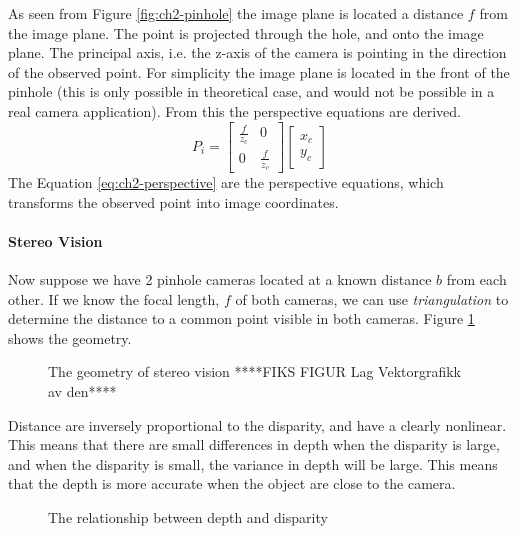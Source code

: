 	As seen from Figure \ref{fig:ch2-pinhole} the image plane is located a distance $f$ from the image plane. 
	The point is projected through the hole, and onto the image plane. The principal axis, i.e. the z-axis of the
	camera is pointing
	in the direction of the observed point. For simplicity the image plane is located in the front of the
	pinhole (this is only possible in theoretical case, and would not be possible in a real camera application).
    From this the perspective equations are derived. \cite{robotbok}
	\begin{equation}
		\label{eq:ch2-perspective}
		P_i = \left[ \begin{array}{cc}
					\frac{f}{z_c} & 0 \\
					0	& \frac{f}{z_c} 
				\end{array} \right] 
				\left[ \begin{array}{c}
					x_c \\
					y_c
					\end{array} \right]
	\end{equation}
	The Equation \eqref{eq:ch2-perspective} are the perspective equations, which transforms the observed 
	point into image coordinates. 


\paragraph{Stereo Vision}
    Now suppose we have 2 pinhole cameras located at a known distance $b$ from each other. 
    If we know the focal length, $f$ of both cameras, we can use \emph{triangulation} to
    determine the distance to a common point visible in both cameras. Figure
    \ref{fig:ch2-stereo_geometry} shows the geometry. 
    \begin{figure}[htbp]
        \centering
        \caption{The geometry of stereo vision ****FIKS FIGUR Lag Vektorgrafikk av den****}
        \label{fig:ch2-stereo_geometry}
    \end{figure}

    Distance are inversely proportional to the disparity, and have a clearly nonlinear.
    This means that there are small differences in depth when the disparity is large, and
    when the disparity is small, the variance in depth will be large. This means that the
    depth is more accurate when the object are close to the camera. 
    \begin{figure}[htbp]
        \centering
        \caption{The relationship between depth and disparity}
        \label{fig:chap2-disparity-depth}
    \end{figure}


